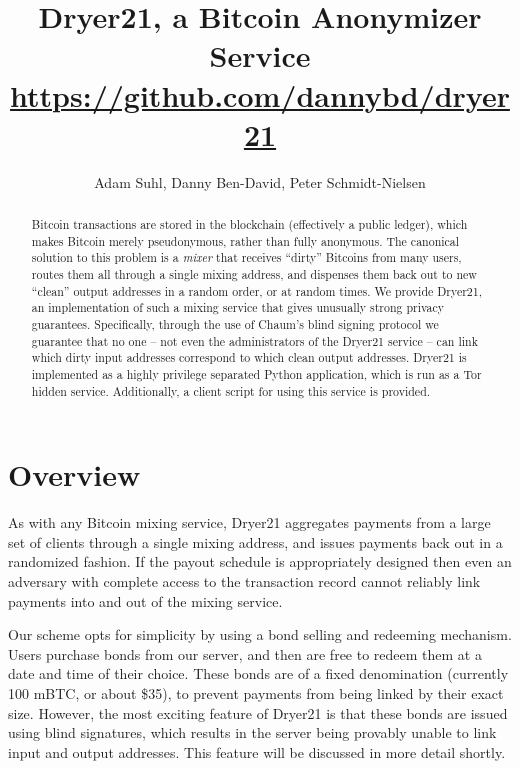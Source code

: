 \documentclass[12pt]{article}
\title{Dryer21, a Bitcoin Anonymizer Service\\\normalsize{\url{https://github.com/dannybd/dryer21}}}
\author{Adam Suhl, Danny Ben-David, Peter Schmidt-Nielsen}
\begin{document}
\maketitle
\begin{abstract}
Bitcoin transactions are stored in the blockchain (effectively a public ledger), which makes Bitcoin merely pseudonymous, rather than fully anonymous.
The canonical solution to this problem is a \emph{mixer} that receives ``dirty'' Bitcoins from many users, routes them all through a single mixing address, and dispenses them back out to new ``clean'' output addresses in a random order, or at random times.
We provide Dryer21, an implementation of such a mixing service that gives unusually strong privacy guarantees.
Specifically, through the use of Chaum's blind signing protocol we guarantee that no one -- not even the administrators of the Dryer21 service -- can link which dirty input addresses correspond to which clean output addresses.
Dryer21 is implemented as a highly privilege separated Python application, which is run as a Tor hidden service.
Additionally, a client script for using this service is provided.
\end{abstract}

\section{Overview}
As with any Bitcoin mixing service, Dryer21 aggregates payments from a large set of clients through a single mixing address, and issues payments back out in a randomized fashion.
If the payout schedule is appropriately designed then even an adversary with complete access to the transaction record cannot reliably link payments into and out of the mixing service.

Our scheme opts for simplicity by using a bond selling and redeeming mechanism.
Users purchase bonds from our server, and then are free to redeem them at a date and time of their choice.
These bonds are of a fixed denomination (currently 100 mBTC, or about \$35), to prevent payments from being linked by their exact size.
However, the most exciting feature of Dryer21 is that these bonds are issued using blind signatures, which results in the server being provably unable to link input and output addresses.
This feature will be discussed in more detail shortly.
\end{document}
